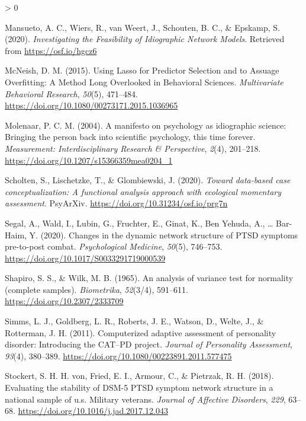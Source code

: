 \documentclass[
  english,
  man]{apa6}
\newlength{\cslhangindent}
\newenvironment{CSLReferences}[2] %
 {%
  \setlength{\parindent}{0pt}
  \ifodd #1 \everypar{\setlength{\hangindent}{\cslhangindent}}\ignorespaces\fi
  \ifnum #2 > 0
  \setlength{\parskip}{#2\baselineskip}
  \fi
 }%
 {}
\begin{document}
\begin{CSLReferences}{1}{0}
\leavevmode\hypertarget{ref-MansuetoEtAl2020}{}%
Mansueto, A. C., Wiers, R., van Weert, J., Schouten, B. C., \& Epskamp, S. (2020). \emph{Investigating the Feasibility of Idiographic Network Models}. Retrieved from \url{https://osf.io/hgcz6}

\leavevmode\hypertarget{ref-McNeish2015}{}%
McNeish, D. M. (2015). Using Lasso for Predictor Selection and to Assuage Overfitting: A Method Long Overlooked in Behavioral Sciences. \emph{Multivariate Behavioral Research}, \emph{50}(5), 471--484. \url{https://doi.org/10.1080/00273171.2015.1036965}

\leavevmode\hypertarget{ref-Molenaar2004}{}%
Molenaar, P. C. M. (2004). A manifesto on psychology as idiographic science: Bringing the person back into scientific psychology, this time forever. \emph{Measurement: Interdisciplinary Research \& Perspective}, \emph{2}(4), 201--218. \url{https://doi.org/10.1207/s15366359mea0204_1}

\leavevmode\hypertarget{ref-ScholtenEtAl2020}{}%
Scholten, S., Lischetzke, T., \& Glombiewski, J. (2020). \emph{Toward data-based case conceptualization: A functional analysis approach with ecological momentary assessment}. PsyArXiv. \url{https://doi.org/10.31234/osf.io/prg7n}

\leavevmode\hypertarget{ref-SegalEtAl2020}{}%
Segal, A., Wald, I., Lubin, G., Fruchter, E., Ginat, K., Ben Yehuda, A., \ldots{} Bar-Haim, Y. (2020). Changes in the dynamic network structure of PTSD symptoms pre-to-post combat. \emph{Psychological Medicine}, \emph{50}(5), 746--753. \url{https://doi.org/10.1017/S0033291719000539}

\leavevmode\hypertarget{ref-ShapiroWilk1965}{}%
Shapiro, S. S., \& Wilk, M. B. (1965). An analysis of variance test for normality (complete samples). \emph{Biometrika}, \emph{52}(3/4), 591--611. \url{https://doi.org/10.2307/2333709}

\leavevmode\hypertarget{ref-SimmsEtAl2011}{}%
Simms, L. J., Goldberg, L. R., Roberts, J. E., Watson, D., Welte, J., \& Rotterman, J. H. (2011). Computerized adaptive assessment of personality disorder: Introducing the CAT--PD project. \emph{Journal of Personality Assessment}, \emph{93}(4), 380--389. \url{https://doi.org/10.1080/00223891.2011.577475}

\leavevmode\hypertarget{ref-vonStockertEtAl2018}{}%
Stockert, S. H. H. von, Fried, E. I., Armour, C., \& Pietrzak, R. H. (2018). Evaluating the stability of DSM-5 PTSD symptom network structure in a national sample of u.s. Military veterans. \emph{Journal of Affective Disorders}, \emph{229}, 63--68. \url{https://doi.org/10.1016/j.jad.2017.12.043}


\end{CSLReferences}
\end{document}
